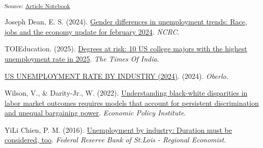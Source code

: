 \documentclass[
]{agujournal2019}
\newlength{\cslhangindent}
\newenvironment{CSLReferences}[2] %
 {\begin{list}{}{%
  \setlength{\itemindent}{0pt}
  \setlength{\leftmargin}{0pt}
  \setlength{\parsep}{0pt}
  \ifodd #1
   \setlength{\leftmargin}{\cslhangindent}
   \setlength{\itemindent}{-1\cslhangindent}
  \fi
  \setlength{\itemsep}{#2\baselineskip}}}
 {\end{list}}
\begin{document}
\vspace{1em}

\textsubscript{Source:
\href{https://mw1296.github.io/dsan5650_social_causal_inference/index.qmd.html}{Article
Notebook}}

\label{refs}
\begin{CSLReferences}{1}{0}
Joseph Dean, E. S. (2024). \href{}{Gender differences in unemployment
trends: Race, jobs and the economy update for february 2024}.
\emph{NCRC}.

TOIEducation. (2025). \href{}{Degrees at risk: 10 US college majors with
the highest unemployment rate in 2025}. \emph{The Times Of India}.

\href{}{US UNEMPLOYMENT RATE BY INDUSTRY (2024)}. (2024). \emph{Oberlo}.

Wilson, V., \& Darity-Jr., W. (2022). \href{}{Understanding black-white
disparities in labor market outcomes requires models that account for
persistent discrimination and unequal bargaining power}. \emph{Economic
Policy Institute}.

YiLi Chien, P. M. (2016). \href{}{Unemployment by industry: Duration
must be considered, too}. \emph{Federal Reserve Bank of St.Lois -
Regional Economist}.

\end{CSLReferences}
\end{document}
